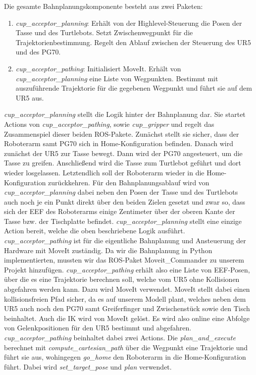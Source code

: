 Die gesamte Bahnplanungskomponente besteht aus zwei Paketen:
\begin{enumerate}
	\item \textit{cup\_acceptor\_planning}:
				\newline
				Erhält von der Highlevel-Steuerung die Posen der Tasse und des Turtlebots. Setzt Zwischenwegpunkt für die Trajektorienbestimmung. Regelt den Ablauf zwischen der Steuerung des UR5 und des PG70.
	\item \textit{cup\_acceptor\_pathing}:
				\newline
				Initialisiert MoveIt. Erhält von \textit{cup\_acceptor\_planning} eine Liste von Wegpunkten. Bestimmt mit auszuführende Trajektorie für die gegebenen Wegpunkt und führt sie auf dem UR5 aus.
\end{enumerate}
\textit{cup\_acceptor\_planning} stellt die Logik hinter der Bahnplanung dar. Sie startet Actions von \textit{cup\_acceptor\_pathing}, sowie \textit{cup\_gripper} und regelt das Zusammenspiel dieser beiden ROS-Pakete. Zunächst stellt sie sicher, dass der Roboterarm samt PG70 sich in Home-Konfiguration befinden. Danach wird zunächst der UR5 zur Tasse bewegt. Dann wird der PG70 angesteuert, um die Tasse zu greifen. Anschließend wird die Tasse zum Turtlebot geführt und dort wieder losgelassen. Letztendlich soll der Roboterarm wieder in die Home-Konfiguration zurückkehren. Für den Bahnplanungsablauf wird von \textit{cup\_acceptor\_planning} dabei neben den Posen der Tasse und des Turtlebots auch noch je ein Punkt direkt über den beiden Zielen gesetzt und zwar so, dass sich der EEF des Roboterarms einige Zentimeter über der oberen Kante der Tasse bzw. der Tischplatte befindet. \textit{cup\_acceptor\_planning} stellt eine einzige Action bereit, welche die oben beschriebene Logik ausführt. 
\newline \\
\textit{cup\_acceptor\_pathing} ist für die eigentliche Bahnplanung und Ansteuerung der Hardware mit MoveIt zuständig. Da wir die Bahnplanung in Python implementierten, mussten wir das ROS-Paket \glqq Moveit\_Commander\grqq \cite{MoveItCommander} zu unserem Projekt hinzufügen. \textit{cup\_acceptor\_pathing} erhält also eine Liste von EEF-Posen, über die es eine Trajektorie berechnen soll, welche vom UR5 ohne Kollisionen abgefahren werden kann. Dazu wird MoveIt verwendet. MoveIt stellt dabei einen kollisionsfreien Pfad sicher, da es auf unserem Modell plant, welches neben dem UR5 auch noch den PG70 samt Greiferfinger und Zwischenstück sowie den Tisch beinhaltet. Auch die IK wird von MoveIt gelöst. Es wird also online eine Abfolge von Gelenkpositionen für den UR5 bestimmt und abgefahren. \textit{cup\_acceptor\_pathing} beinhaltet dabei zwei Actions. Die \textit{plan\_and\_execute} berechnet mit \textit{compute\_cartesian\_path} über die Wegpunkt eine Trajektorie und führt sie aus, wohingegen \textit{go\_home} den Roboterarm in die Home-Konfiguration führt. Dabei wird \textit{set\_target\_pose} und \textit{plan} verwendet.
